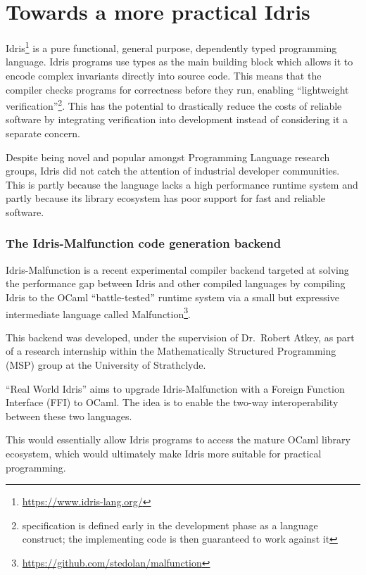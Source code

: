 \section{Towards a more practical Idris}

Idris\footnote{\url{https://www.idris-lang.org/}} is a pure functional,
general purpose, dependently typed programming language.
Idris programs use types as the main building block which allows it
to encode complex invariants directly into source code.
This means that the compiler checks programs for
correctness before they run, enabling
``lightweight verification''\footnote{specification is
	defined early in the development phase as a language construct;
	the implementing code is then guaranteed to work against it}.
This has the potential to drastically reduce the costs
of reliable software by integrating verification into development
instead of considering it a separate concern.

Despite being novel and popular amongst Programming Language research
groups, Idris did not catch the attention of industrial developer
communities.
This is partly because the language lacks a high performance
runtime system and partly because its library ecosystem has poor
support for fast and reliable software.

\subsubsection{The Idris-Malfunction code generation backend}

Idris-Malfunction is a recent experimental compiler backend targeted at
solving the performance gap between Idris and other compiled languages
by compiling Idris to the OCaml ``battle-tested'' runtime system
via a small but expressive intermediate language
called
Malfunction\footnote{\url{https://github.com/stedolan/malfunction}}.

This backend was developed, under the supervision of
Dr.~Robert Atkey, as part of a research internship
within the Mathematically Structured Programming (MSP) group at the
University of Strathclyde.

``Real World Idris'' aims to upgrade Idris-Malfunction
with a Foreign Function Interface (FFI) to OCaml.
The idea is to enable the two-way interoperability between these two
languages.

This would essentially allow Idris programs to access the mature OCaml
library ecosystem, which would ultimately make Idris more suitable
for practical programming.



